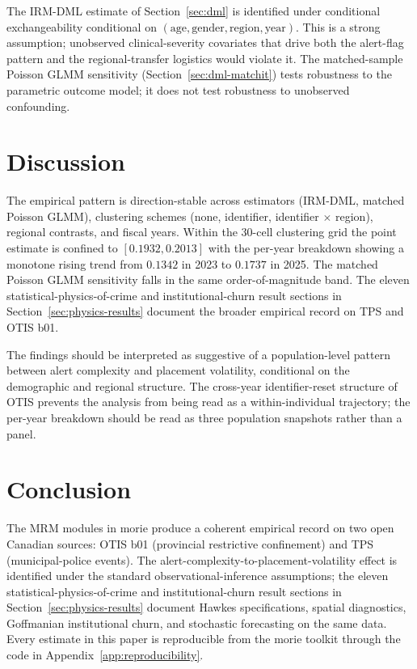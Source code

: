 \documentclass[article,shortnames,nojss]{jss}
\newcommand{\OTIS}{\textsf{OTIS}}
\newcommand{\TPS}{\textsf{TPS}}
\begin{document}
The IRM-DML estimate of Section~\ref{sec:dml} is identified under
conditional exchangeability conditional on
$(\mathrm{age}, \mathrm{gender}, \mathrm{region}, \mathrm{year})$.
This is a strong assumption; unobserved clinical-severity covariates
that drive both the alert-flag pattern and the regional-transfer
logistics would violate it. The matched-sample Poisson GLMM
sensitivity (Section~\ref{sec:dml-matchit}) tests robustness to the
parametric outcome model; it does not test robustness to unobserved
confounding.

\section{Discussion}
\label{sec:discussion}

The empirical pattern is direction-stable across estimators
(IRM-DML, matched Poisson GLMM), clustering schemes (none, identifier,
identifier $\times$ region), regional contrasts, and fiscal years.
Within the 30-cell clustering grid the point estimate is confined
to $[0.1932, 0.2013]$ with the per-year breakdown showing a monotone
rising trend from $0.1342$ in 2023 to $0.1737$ in 2025. The matched
Poisson GLMM sensitivity falls in the same order-of-magnitude band.
The eleven statistical-physics-of-crime and institutional-churn
result sections in Section~\ref{sec:physics-results} document the
broader empirical record on \TPS{} and \OTIS{} b01.

The findings should be interpreted as suggestive of a population-level
pattern between alert complexity and placement volatility, conditional
on the demographic and regional structure. The cross-year
identifier-reset structure of \OTIS{} prevents the analysis from
being read as a within-individual trajectory; the per-year breakdown
should be read as three population snapshots rather than a panel.

\section{Conclusion}
\label{sec:conclusion}

The MRM modules in morie produce a coherent empirical record on
two open Canadian sources: \OTIS{} b01 (provincial restrictive
confinement) and \TPS{} (municipal-police events). The
alert-complexity-to-placement-volatility effect is identified under
the standard observational-inference assumptions; the eleven
statistical-physics-of-crime and institutional-churn result sections
in Section~\ref{sec:physics-results} document Hawkes specifications,
spatial diagnostics, Goffmanian institutional churn, and stochastic
forecasting on the same data. Every
estimate in this paper is reproducible from the morie toolkit
through the code in Appendix~\ref{app:reproducibility}.
\end{document}
